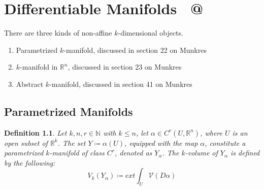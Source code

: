 \documentclass[11pt,oneside]{book}
\makeatletter
\theoremstyle{break}
\theoremstyle{break}
\newtheorem{defn}{Definition}[corL]
\newcommand{\R}{\mathbb{R}}
\newcommand{\N}{\mathbb{N}}
\newcommand*{\rom}[1]{\expandafter\@slowromancap\romannumeral #1@}
\makeatother
\begin{document}
\newpage
\chapter{Differentiable Manifolds \ \rom{1}}
\setcounter{section}{14}
There are three kinds of non-affine $k$-dimensional objects. 
\begin{enumerate}[topsep=3pt,itemsep=-1ex,partopsep=1ex,parsep=1ex]
\item Parametrized $k$-manifold, discussed in section 22 on Munkres
\item $k$-manifold in $\R^n$, discussed in section 23 on Munkres
\item Abstract $k$-manifold, discussed in section 41 on Munkres
\end{enumerate} 

\section[Parametrized Manifolds]{\color{red} Parametrized Manifolds \color{black}}

\begin{defn}
Let $k,n,r\in \N$ with $k \leq n$, let $\alpha \in C^r(U, \R^n)$, where $U$ is an open subset of $\R^k$.  The set $Y \coloneqq \alpha(U)$, equipped with the map $\alpha$, constitute a parametrized $k$-manifold of class $C^r$, denoted as $Y_\alpha$. The $k$-volume of $Y_\alpha$ is defined by the following:
$$V_k(Y_\alpha) \coloneqq ext \int_U \mathcal{V}(D\alpha)$$
\end{defn}
\end{document}
